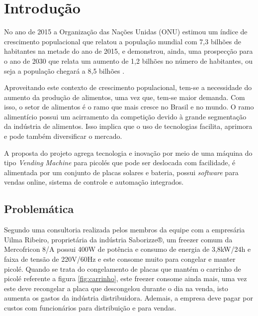 \chapter{Introdução}

 No ano de 2015 a Organização das Nações Unidas (ONU) estimou um índice  de crescimento populacional que relatou a população mundial com 7,3 bilhões de habitantes na metade do ano de 2015, e  demonstrou, ainda, uma prospecção para o ano de 2030 que relata um aumento de 1,2 bilhões no número de habitantes, ou seja a população chegará a
8,5 bilhões \cite {ONU}.

Aproveitando este contexto de crescimento populacional, tem-se a necessidade do aumento da produção de alimentos, uma vez que, tem-se maior demanda. Com isso, o setor de alimentos é o ramo que mais cresce no Brasil e no mundo. O ramo alimentício possui um acirramento da competição devido à grande segmentação da indústria de alimentos. Isso implica que o uso de tecnologias facilita, aprimora e pode também diversificar o mercado. \cite{IBIA}

A proposta do projeto agrega tecnologia e inovação por meio de uma máquina do tipo \textit{Vending Machine} para picolés que pode ser deslocada com facilidade, é alimentada por um conjunto de placas solares e bateria, possui \textit{software} para vendas online, sistema de controle e automação integrados.

\section{Problemática}

Segundo uma consultoria realizada pelos membros da equipe com a empresária Uilma Ribeiro, proprietária da indústria Saborizze®, um freezer comum da Mercofricon 8/A possui 400W de potência e consumo de energia de 3,8kW/24h e faixa de tensão de 220V/60Hz e este consome muito para congelar e manter picolé. Quando se trata do congelamento de placas que mantém o carrinho de picolé referente a figura \ref{fig:carrinho}, este freezer consome ainda mais, uma vez este deve recongelar a placa que descongelou durante o dia na venda, isto aumenta os gastos da indústria distribuidora. Ademais, a empresa deve pagar por custos com funcionários para distribuição e para vendas.

